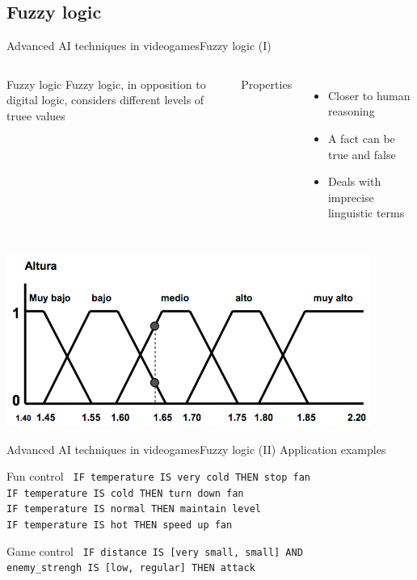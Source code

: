 \documentclass[10pt,compress]{beamer} %
\begin{document}
\subsection{Fuzzy logic}
\begin{frame}{Advanced AI techniques in videogames}{Fuzzy logic (I)}
    \begin{columns}
	   \vspace{-0.8cm}
		\begin{block}{Fuzzy logic}
		Fuzzy logic, in opposition to digital logic, considers different levels of truee values
		\end{block}
		Properties
		\begin{itemize}
		\item Closer to human reasoning
		\item A fact can be true and false
		\item Deals with imprecise linguistic terms
		\end{itemize}
	\end{columns}

		\centering\includegraphics[width=0.6\linewidth]{figs/fuzzy}\\
\end{frame}

\begin{frame}{Advanced AI techniques in videogames}{Fuzzy logic (II)}
	\centering Application examples
		\begin{block}{Fun control}
		\texttt{
IF temperature IS very cold THEN stop fan\\
IF temperature IS cold THEN turn down fan\\
IF temperature IS normal THEN maintain level\\
IF temperature IS hot THEN speed up fan\\
}
		\end{block}
		\begin{block}{Game control}
\texttt{
IF distance IS [very small, small] AND \\
	enemy\_strengh IS [low, regular] THEN attack		
	}
		\end{block}
\end{frame}
\end{document}
